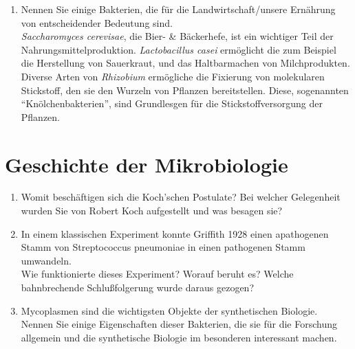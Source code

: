 \begin{enumerate}
		\item Nennen Sie einige Bakterien, die für die Landwirtschaft/unsere Ernährung von entscheidender Bedeutung sind. \hfill \\
	\emph{Saccharomyces cerevisae}, die Bier- \& Bäckerhefe,
	ist ein wichtiger Teil der Nahrungsmittelproduktion.
	\emph{Lactobacillus casei} ermöglicht die zum Beispiel die Herstellung von Sauerkraut,
	und das Haltbarmachen von Milchprodukten.
	Diverse Arten von \emph{Rhizobium} ermögliche die Fixierung von molekularen Stickstoff,
	den sie den Wurzeln von Pflanzen bereitstellen.
	Diese, sogenannten ``Knölchenbakterien'', sind Grundlesgen für die Stickstoffversorgung der Pflanzen.
	\end{enumerate}


\section{Geschichte der Mikrobiologie}
	\begin{enumerate}
		\item Womit beschäftigen sich die Koch’schen Postulate? Bei welcher Gelegenheit wurden Sie von Robert Koch aufgestellt und was besagen sie? \hfill \vspace{4mm}
		\item In einem klassischen Experiment konnte Griffith 1928 einen apathogenen Stamm von Streptococcus pneumoniae in einen pathogenen Stamm umwandeln.\\
			Wie funktionierte dieses Experiment? Worauf beruht es? Welche bahnbrechende Schlußfolgerung wurde daraus gezogen? \hfill \vspace{4mm}
		\item Mycoplasmen sind die wichtigsten Objekte der synthetischen Biologie. Nennen Sie einige Eigenschaften dieser Bakterien, die sie für die Forschung allgemein und die synthetische Biologie im besonderen interessant machen. \hfill \vspace{4mm}
	\end{enumerate}

